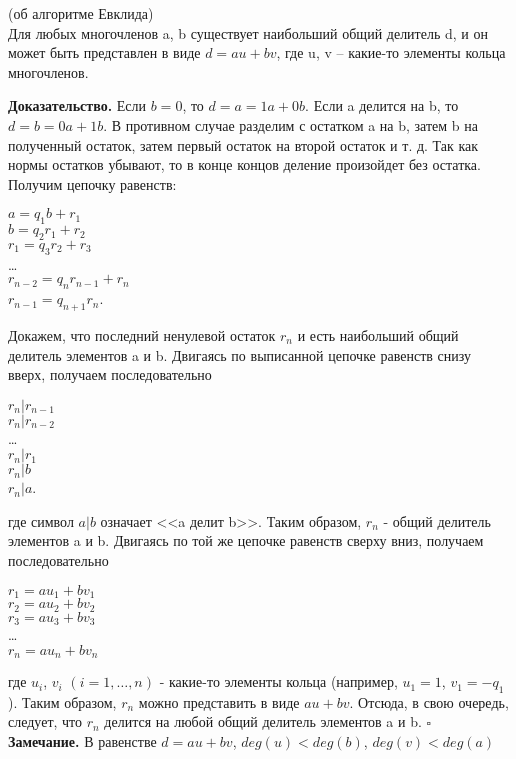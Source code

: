 \begin{theor} (об алгоритме Евклида)\\
Для любых многочленов a, b существует наибольший общий делитель d, и он может
быть представлен в виде $d=au+bv$, где u, v – какие-то элементы кольца
многочленов. 
\end{theor}
\textbf{Доказательство.} Если $b=0$, то $d=a=1a+0b$. Если a делится на b, то
$d=b=0a+1b$. В противном случае разделим с остатком a на b, затем b на 
полученный остаток, затем первый остаток на второй остаток и т. д. Так как
нормы остатков убывают, то в конце концов деление произойдет без остатка. 
Получим цепочку равенств:
\begin{center}
  $a=q_1b+r_1$\\
$b=q_2r_1+r_2$\\
$r_1=q_3r_2+r_3$\\
\ldots\\
$r_{n-2} = q_nr_{n-1} + r_n$\\
$r_{n-1} = q_{n+1}r_n$.  
\end{center}
Докажем, что последний ненулевой остаток $r_n$ и есть наибольший общий
делитель элементов a и b.
Двигаясь по выписанной цепочке равенств снизу вверх, получаем последовательно
\begin{center}
$r_n | r_{n-1}$\\
$r_n | r_{n-2}$\\
\ldots\\
$r_n | r_1$\\
$r_n | b$\\
$r_n | a$.
\end{center}
где символ $a|b$ означает <<a делит b>>.
Таким образом, $r_n$ - общий делитель элементов a и b. Двигаясь по той же 
цепочке равенств сверху вниз, получаем последовательно
\begin{center}
$r_1 = au_1 + bv_1$\\
$r_2 = au_2 + bv_2$\\
$r_3 = au_3 + bv_3$\\
\ldots\\
$r_n = au_n + bv_n$\\  
\end{center}
где $u_i$, $v_i$ $(i =1, \ldots, n)$ - какие-то элементы кольца 
(например, $u_1=1$, $v_1 = -q_1$). Таким образом, $r_n$ можно представить
в виде $au + bv$.
Отсюда, в свою очередь, следует, что $r_n$ делится на любой общий делитель 
элементов a и b. $\square$\\
\textbf{Замечание.} В равенстве $d=au+bv$,  $deg(u)<deg(b)$, $deg(v)<deg(a)$ \\
